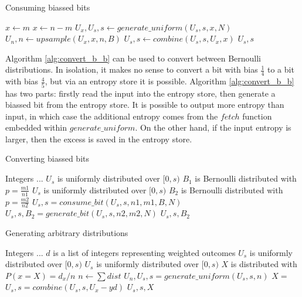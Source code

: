 \documentclass[12pt]{article}
\begin{document}
\begin{algorithm}
\caption{Consuming biassed bits}
\label{alg:consume_b}
\begin{algorithmic}[1]
        \State $x \gets m$
    \Else
        \State $x \gets n-m$
    \EndIf
    \State $U_x, U_s, s \gets generate\_uniform(U_s, s, x, N)$
    \State $U_n, n \gets upsample(U_x, x, n, B)$
    \State $U_s, s \gets combine(U_s, s, U_x, x)$
    \State \Return $U_s, s$
\EndProcedure
\end{algorithmic}
\end{algorithm}

Algorithm \ref{alg:convert_b_b} can be used to convert between Bernoulli distributions. In isolation, it makes no sense to convert a bit with bias $\frac{1}{4}$ to a bit with bias $\frac{4}{5}$, but via an entropy store it is possible. Algorithm \ref{alg:convert_b_b} has two parts: firstly read the input into the entropy store, then generate a biassed bit from the entropy store. It is possible to output more entropy than input, in which case the additional entropy comes from the $fetch$ function embedded within $generate\_uniform$. On the other hand, if the input entropy is larger, then the excess is saved in the entropy store.

\begin{algorithm}
\caption{Converting biassed bits}
\label{alg:convert_b_b}
\begin{algorithmic}[1]
    \Require Integers ...
    \Require $U_s$ is uniformly distributed over $[0,s)$
    \Require $B_1$ is Bernoulli distributed with $p=\frac{m1}{n1}$
    \Ensure $U_s$ is uniformly distributed over $[0,s)$
    \Ensure $B_2$ is Bernoulli distributed with $p=\frac{m2}{n2}$
    \State $U_s, s = consume\_bit(U_s, s, n1, m1, B, N)$
    \State $U_s, s, B_2 = generate\_bit(U_s, s, n2, m2, N)$
    \State \Return $U_s, s, B_2$
\EndProcedure
\end{algorithmic}
\end{algorithm}

\begin{algorithm}

\caption{Generating arbitrary distributions}
\label{alg:generate_discrete}
\begin{algorithmic}[1]
    \Require Integers ...
    \Require $d$ is a list of integers representing weighted outcomes
    \Require $U_s$ is uniformly distributed over $[0,s)$
    \Ensure $U_s$ is uniformly distributed over $[0,s)$
    \Ensure $X$ is distributed with $P(x=X) = d_x/n$
    \State $n \gets \sum dist$
    \State $U_n, U_s, s = generate\_uniform(U_s, s, n)$
    \State $X = $
    \State $U_s, s = combine(U_s, s, U_x - y d)$
    \State \Return $U_s, s, X$
\EndProcedure
\end{algorithmic}
\end{algorithm}
\end{document}
